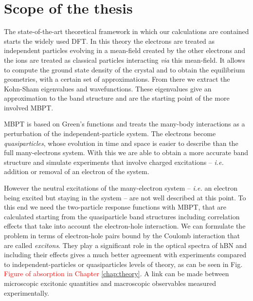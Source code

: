 




\section*{Scope of the thesis}
%
The state-of-the-art theoretical framework in which our calculations are contained starts the widely used \acrfull{DFT}.\cite{kohn1996density} In this theory the electrons are treated as independent particles evolving in a mean-field created by the other electrons and the ions are treated as classical particles interacting \textit{via} this mean-field. It allows to compute the ground state density of the crystal and to obtain the equilibrium geometries, with a certain set of approximations. From there we extract the Kohn-Sham eigenvalues and wavefunctions. These eigenvalues give an approximation to the band structure and are the starting point of the more involved \acrfull{MBPT}. 

\acrshort{MBPT} is based on Green's functions and treats the many-body interactions as a perturbation of the independent-particle system. The electrons become \textit{quasiparticles}, whose evolution in time and space is easier to describe than the full many-electrons system.\cite{hedin1965new,aryasetiawan1998gw}
With this we are able to obtain a more accurate band structure and simulate experiments that involve charged excitations -- \textit{i.e.} addition or removal of an electron of the system. 

However the neutral excitations of the many-electron system -- \textit{i.e.} an electron being excited but staying in the system -- are not well described at this point. To this end we need the two-particle response functions with \acrshort{MBPT}, that are calculated starting from the quasiparticle band structures including correlation effects that take into account the electron-hole interaction. We can formulate the problem in terms of electron-hole pairs bound by the Coulomb interaction that are called \textit{excitons}. They play a significant role in the optical spectra of \acrshort{hBN} and including their effects gives a much better agreement with experiments compared to independent-particles or quasiparticles levels of theory, as can be seen in Fig. \textcolor{red}{Figure of absorption in Chapter \ref{chap:theory}}. A link can be made between microscopic excitonic quantities and macroscopic observables measured experimentally. 

